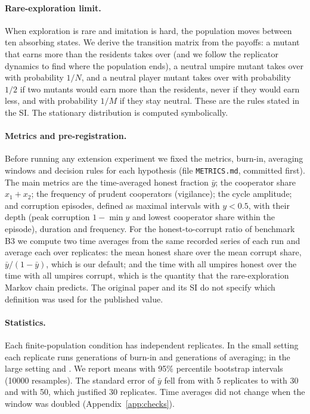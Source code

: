 \documentclass[11pt]{article}
\begin{document}
\paragraph{Rare-exploration limit.}\label{sec:methods-markov} When exploration is rare and
imitation is hard, the population moves between ten absorbing states. We derive the transition
matrix from the payoffs: a mutant that earns more than the residents takes over (and we follow the
replicator dynamics to find where the population ends), a neutral umpire mutant takes over with
probability $1/N$, and a neutral player mutant takes over with probability $1/2$ if two mutants
would earn more than the residents, never if they would earn less, and with probability $1/M$ if
they stay neutral. These are the rules stated in the SI. The stationary
distribution is computed symbolically.

\paragraph{Metrics and pre-registration.} Before running any extension experiment we fixed the
metrics, burn-in, averaging windows and decision rules for each hypothesis (file
\texttt{METRICS.md}, committed first). The main metrics are the time-averaged honest fraction
$\bar y$; the cooperator share $x_1+x_2$; the frequency of prudent cooperators (vigilance); the
cycle amplitude; and corruption episodes, defined as maximal intervals with $y<0.5$, with their
depth (peak corruption $1-\min y$ and lowest cooperator share within the episode), duration and
frequency.
For the honest-to-corrupt ratio of benchmark B3 we compute two time averages from the same
recorded series of each run and average each over replicates: the mean honest share over the
mean corrupt share, $\bar y/(1-\bar y)$, which is our default; and the time with all umpires
honest over the time with all umpires corrupt, which is the quantity that the rare-exploration
Markov chain predicts. The original paper and its SI do not specify which definition was used
for the published value.

\paragraph{Statistics.} Each finite-population condition has \Nreps{} independent replicates. In
the small setting each replicate runs \BurnSmall{} generations of burn-in and \WinSmall{}
generations of averaging; in the large setting \BurnLarge{} and \WinLarge{}. We report means with
95\% percentile bootstrap intervals (10000 resamples). The standard error of $\bar y$ fell from
\SEFive{} with 5 replicates to \SEThirty{} with 30 and \SEFifty{} with 50, which justified 30
replicates. Time averages did not change when the window was doubled (Appendix~\ref{app:checks}).
\end{document}
